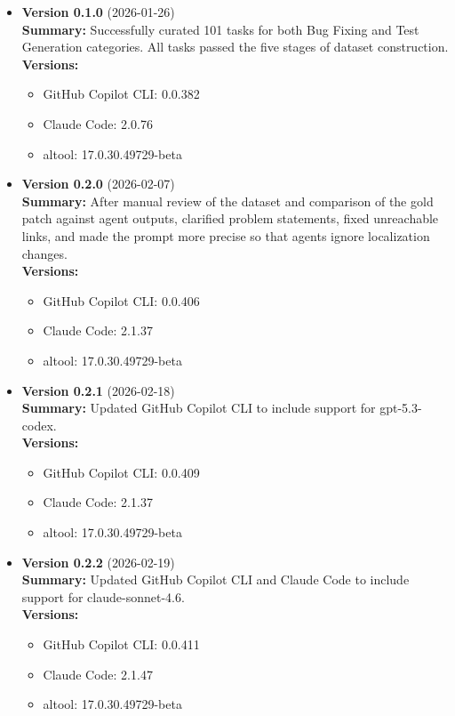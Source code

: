 \documentclass{article}
\begin{document}
\begin{itemize}
\item \textbf{Version 0.1.0} \hfill (2026-01-26)\\
\textbf{Summary:} Successfully curated 101 tasks for both Bug Fixing and Test Generation categories. All tasks passed the five stages of dataset construction.\\
\textbf{Versions:}
\begin{itemize}
\item GitHub Copilot CLI: 0.0.382
\item Claude Code: 2.0.76
\item altool: 17.0.30.49729-beta
\end{itemize}

\item \textbf{Version 0.2.0} \hfill (2026-02-07)\\
\textbf{Summary:} After manual review of the dataset and comparison of the gold patch against agent outputs, clarified problem statements, fixed unreachable links, and made the prompt more precise so that agents ignore localization changes.\\
\textbf{Versions:}
\begin{itemize}
\item GitHub Copilot CLI: 0.0.406
\item Claude Code: 2.1.37
\item altool: 17.0.30.49729-beta
\end{itemize}

\item \textbf{Version 0.2.1} \hfill (2026-02-18)\\
\textbf{Summary:} Updated GitHub Copilot CLI to include support for gpt-5.3-codex.\\
\textbf{Versions:}
\begin{itemize}
\item GitHub Copilot CLI: 0.0.409
\item Claude Code: 2.1.37
\item altool: 17.0.30.49729-beta
\end{itemize}

\item \textbf{Version 0.2.2} \hfill (2026-02-19)\\
\textbf{Summary:} Updated GitHub Copilot CLI and Claude Code to include support for claude-sonnet-4.6.\\
\textbf{Versions:}
\begin{itemize}
\item GitHub Copilot CLI: 0.0.411
\item Claude Code: 2.1.47
\item altool: 17.0.30.49729-beta
\end{itemize}


\end{itemize}
\end{document}

